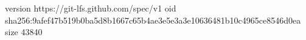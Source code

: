 version https://git-lfs.github.com/spec/v1
oid sha256:9afef47b519b0ba5d8b1667c65b4ae3e5e3a3e10636481b10c4965ce8546d0ea
size 43840
